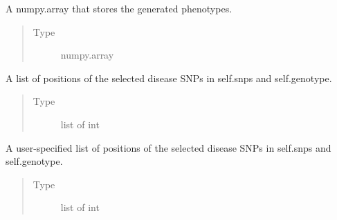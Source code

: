 \documentclass[a4paper,10pt,english]{sphinxhowto}
\begin{document}
\begin{fulllineitems}
\begin{fulllineitems}
\begin{quote}
\begin{description}
\end{description}\end{quote}

\end{fulllineitems}


\begin{fulllineitems}
\label{\detokenize{utils:utils.data_simulator.DataSimulator.phenotype}}
A numpy.array that stores the generated phenotypes.
\begin{quote}\begin{description}
\item[{Type}] \leavevmode
numpy.array

\end{description}\end{quote}

\end{fulllineitems}


\begin{fulllineitems}
\label{\detokenize{utils:utils.data_simulator.DataSimulator.disease_snps}}
A list of positions of the selected disease SNPs in self.snps and self.genotype.
\begin{quote}\begin{description}
\item[{Type}] \leavevmode
list of int

\end{description}\end{quote}

\end{fulllineitems}


\begin{fulllineitems}
\label{\detokenize{utils:utils.data_simulator.DataSimulator.input_disease_snps}}
A user-specified list of positions of the selected disease SNPs in self.snps and self.genotype.
\begin{quote}\begin{description}
\item[{Type}] \leavevmode
list of int


\end{description}
\end{quote}
\end{fulllineitems}
\end{fulllineitems}
\end{document}
